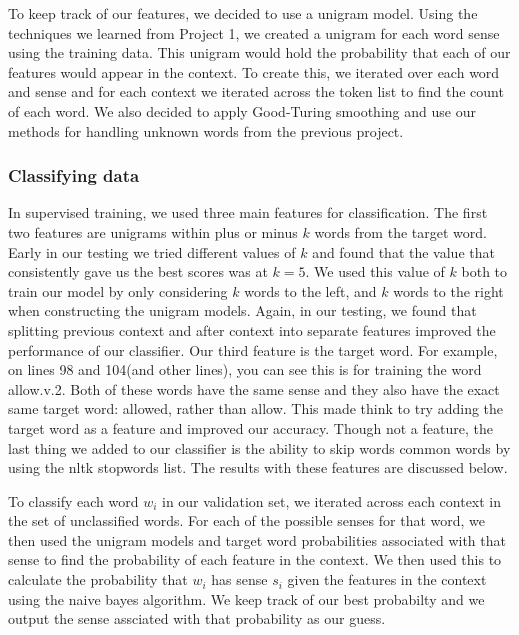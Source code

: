 \documentclass[11pt]{article}
\begin{document}
To keep track of our features, we decided to use a unigram model. Using the techniques we learned from Project 1, we created a unigram for each word sense using the training data. This unigram would hold the probability that each of our features would appear in the context. To create this, we iterated over each word and sense and for each context we iterated across the token list to find the count of each word. We also decided to apply Good-Turing smoothing and use our methods for handling unknown words from the previous project. \\ 

\subsubsection{Classifying data}
In supervised training, we used three main features for classification. The first two features are unigrams within plus or minus $k$ words from the target word. Early in our testing we tried different values of $k$ and found that the value that consistently gave us the best scores was at $k=5$. We used this value of $k$ both to train our model by only considering $k$ words to the left, and $k$ words to the right when constructing the unigram models. Again, in our testing, we found that splitting previous context and after context into separate features improved the performance of our classifier. Our third feature is the target word. For example, on lines 98 and 104(and other lines), you can see this is for training the word allow.v.2. Both of these words have the same sense and they also have the exact same target word: allowed, rather than allow. This made think to try adding the target word as a feature and improved our accuracy. Though not a feature, the last thing we added to our classifier is the ability to skip words common words by using the nltk stopwords list. The results with these features are discussed below. 

To classify each word $w_i$ in our validation set, we iterated across each context in the set of unclassified words. For each of the possible senses for that word, we then used the unigram models and target word probabilities associated with that sense to find the probability of each feature in the context. We then used this to calculate the probability that $w_i$ has sense $s_i$ given the features in the context using the naive bayes algorithm. We keep track of our best probabilty and we output the sense assciated with that probability as our guess.
\end{document}
